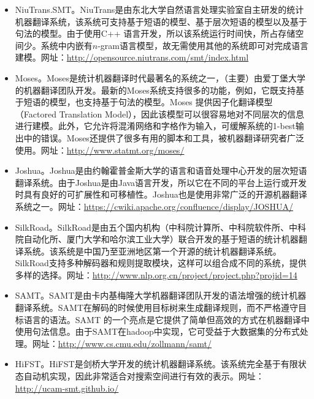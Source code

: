 \begin{appendices}
\begin{itemize}
\vspace{0.5em}
\item NiuTrans.SMT。NiuTrans是由东北大学自然语言处理实验室自主研发的统计机器翻译系统，该系统可支持基于短语的模型、基于层次短语的模型以及基于句法的模型。由于使用C++ 语言开发，所以该系统运行时间快，所占存储空间少。系统中内嵌有$n$-gram语言模型，故无需使用其他的系统即可对完成语言建模。网址：\url{http://opensource.niutrans.com/smt/index.html}
\vspace{0.5em}
\item Moses。Moses是统计机器翻译时代最著名的系统之一，（主要）由爱丁堡大学的机器翻译团队开发。最新的Moses系统支持很多的功能，例如，它既支持基于短语的模型，也支持基于句法的模型。Moses 提供因子化翻译模型（Factored Translation Model），因此该模型可以很容易地对不同层次的信息进行建模。此外，它允许将混淆网络和字格作为输入，可缓解系统的1-best输出中的错误。Moses还提供了很多有用的脚本和工具，被机器翻译研究者广泛使用。网址：\url{http://www.statmt.org/moses/}
\vspace{0.5em}
\item Joshua。Joshua是由约翰霍普金斯大学的语言和语音处理中心开发的层次短语翻译系统。由于Joshua是由Java语言开发，所以它在不同的平台上运行或开发时具有良好的可扩展性和可移植性。Joshua也是使用非常广泛的开源机器翻译系统之一。网址：\url{https://cwiki.apache.org/confluence/display/JOSHUA/}
\vspace{0.5em}
\item SilkRoad。SilkRoad是由五个国内机构（中科院计算所、中科院软件所、中科院自动化所、厦门大学和哈尔滨工业大学）联合开发的基于短语的统计机器翻译系统。该系统是中国乃至亚洲地区第一个开源的统计机器翻译系统。SilkRoad支持多种解码器和规则提取模块，这样可以组合成不同的系统，提供多样的选择。网址：\url{http://www.nlp.org.cn/project/project.php?projid=14}
\vspace{0.5em}
\item SAMT。SAMT是由卡内基梅隆大学机器翻译团队开发的语法增强的统计机器翻译系统。SAMT在解码的时候使用目标树来生成翻译规则，而不严格遵守目标语言的语法。SAMT 的一个亮点是它提供了简单但高效的方式在机器翻译中使用句法信息。由于SAMT在hadoop中实现，它可受益于大数据集的分布式处理。网址：\url{http://www.cs.cmu.edu/zollmann/samt/}
\vspace{0.5em}
\item HiFST。HiFST是剑桥大学开发的统计机器翻译系统。该系统完全基于有限状态自动机实现，因此非常适合对搜索空间进行有效的表示。网址：\url{http://ucam-smt.github.io/}

\end{itemize}
\end{appendices}
